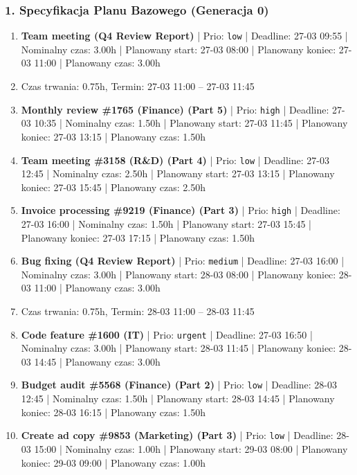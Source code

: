 \subsubsection*{1. Specyfikacja Planu Bazowego (Generacja 0)}
{\small
\begin{enumerate}
  \item [\textbf{14682}] \textbf{Team meeting (Q4 Review Report)} | Prio: \texttt{low} | Deadline: 27-03 09:55 | Nominalny czas: 3.00h | Planowany start: 27-03 08:00 | Planowany koniec: 27-03 11:00 | Planowany czas: 3.00h
  \item [\textbf{PRZERWA}] Czas trwania: 0.75h, Termin: 27-03 11:00 -- 27-03 11:45
  \item [\textbf{14627}] \textbf{Monthly review \#1765 (Finance) (Part 5)} | Prio: \texttt{high} | Deadline: 27-03 10:35 | Nominalny czas: 1.50h | Planowany start: 27-03 11:45 | Planowany koniec: 27-03 13:15 | Planowany czas: 1.50h
  \item [\textbf{14688}] \textbf{Team meeting \#3158 (R\&D) (Part 4)} | Prio: \texttt{low} | Deadline: 27-03 12:45 | Nominalny czas: 2.50h | Planowany start: 27-03 13:15 | Planowany koniec: 27-03 15:45 | Planowany czas: 2.50h
  \item [\textbf{14622}] \textbf{Invoice processing \#9219 (Finance) (Part 3)} | Prio: \texttt{high} | Deadline: 27-03 16:00 | Nominalny czas: 1.50h | Planowany start: 27-03 15:45 | Planowany koniec: 27-03 17:15 | Planowany czas: 1.50h
  \item [\textbf{14647}] \textbf{Bug fixing (Q4 Review Report)} | Prio: \texttt{medium} | Deadline: 27-03 16:00 | Nominalny czas: 3.00h | Planowany start: 28-03 08:00 | Planowany koniec: 28-03 11:00 | Planowany czas: 3.00h
  \item [\textbf{PRZERWA}] Czas trwania: 0.75h, Termin: 28-03 11:00 -- 28-03 11:45
  \item [\textbf{14605}] \textbf{Code feature \#1600 (IT)} | Prio: \texttt{urgent} | Deadline: 27-03 16:50 | Nominalny czas: 3.00h | Planowany start: 28-03 11:45 | Planowany koniec: 28-03 14:45 | Planowany czas: 3.00h
  \item [\textbf{14693}] \textbf{Budget audit \#5568 (Finance) (Part 2)} | Prio: \texttt{low} | Deadline: 28-03 12:45 | Nominalny czas: 1.50h | Planowany start: 28-03 14:45 | Planowany koniec: 28-03 16:15 | Planowany czas: 1.50h
  \item [\textbf{14679}] \textbf{Create ad copy \#9853 (Marketing) (Part 3)} | Prio: \texttt{low} | Deadline: 28-03 15:00 | Nominalny czas: 1.00h | Planowany start: 29-03 08:00 | Planowany koniec: 29-03 09:00 | Planowany czas: 1.00h

\end{enumerate}}
